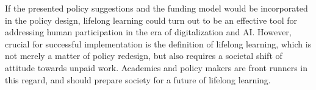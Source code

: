 If the presented policy suggestions and the funding model would be incorporated in the policy design, lifelong learning could turn out to be an effective tool for addressing human participation in the era of digitalization and AI. However, crucial for successful implementation is the definition of lifelong learning, which is not merely a matter of policy redesign, but also requires a societal shift of attitude towards unpaid work. Academics and policy makers are front runners in this regard, and should prepare society for a future of lifelong learning.  


